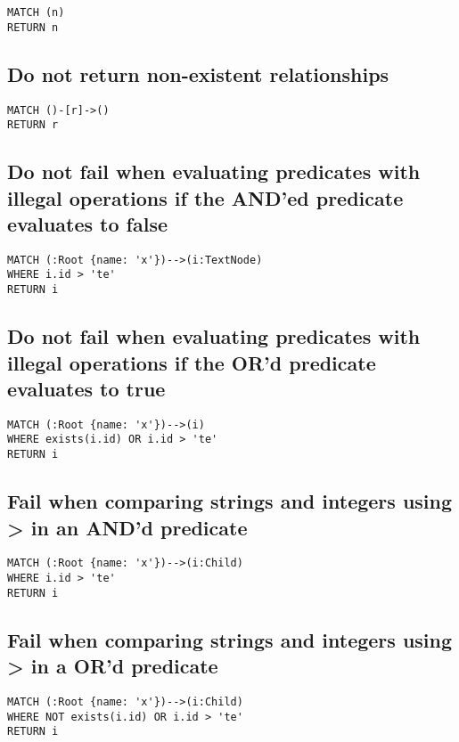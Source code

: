 \begin{lstlisting}
MATCH (n)
RETURN n
\end{lstlisting}

\subsection{Do not return non-existent relationships}

\begin{lstlisting}
MATCH ()-[r]->()
RETURN r
\end{lstlisting}

\subsection{Do not fail when evaluating predicates with illegal operations if the AND'ed predicate evaluates to false}

\begin{lstlisting}
MATCH (:Root {name: 'x'})-->(i:TextNode)
WHERE i.id > 'te'
RETURN i
\end{lstlisting}

\subsection{Do not fail when evaluating predicates with illegal operations if the OR'd predicate evaluates to true}

\begin{lstlisting}
MATCH (:Root {name: 'x'})-->(i)
WHERE exists(i.id) OR i.id > 'te'
RETURN i
\end{lstlisting}

\subsection{Fail when comparing strings and integers using > in an AND'd predicate}

\begin{lstlisting}
MATCH (:Root {name: 'x'})-->(i:Child)
WHERE i.id > 'te'
RETURN i
\end{lstlisting}

\subsection{Fail when comparing strings and integers using > in a OR'd predicate}

\begin{lstlisting}
MATCH (:Root {name: 'x'})-->(i:Child)
WHERE NOT exists(i.id) OR i.id > 'te'
RETURN i
\end{lstlisting}

